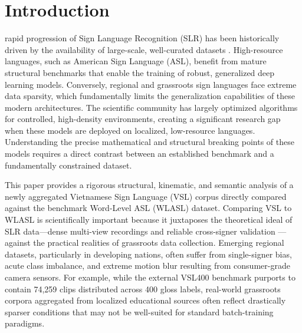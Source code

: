 \documentclass{ieeeaccess}
\begin{document}
\section{Introduction}
\label{sec:introduction}
 rapid progression of Sign Language Recognition (SLR) has been historically driven by the availability of large-scale, well-curated datasets \cite{b1}. High-resource languages, such as American Sign Language (ASL), benefit from mature structural benchmarks that enable the training of robust, generalized deep learning models. Conversely, regional and grassroots sign languages face extreme data sparsity, which fundamentally limits the generalization capabilities of these modern architectures. The scientific community has largely optimized algorithms for controlled, high-density environments, creating a significant research gap when these models are deployed on localized, low-resource languages. Understanding the precise mathematical and structural breaking points of these models requires a direct contrast between an established benchmark and a fundamentally constrained dataset.

This paper provides a rigorous structural, kinematic, and semantic analysis of a newly aggregated Vietnamese Sign Language (VSL) corpus directly compared against the benchmark Word-Level ASL (WLASL) dataset. Comparing VSL to WLASL is scientifically important because it juxtaposes the theoretical ideal of SLR data—dense multi-view recordings and reliable cross-signer validation \cite{b1}—against the practical realities of grassroots data collection. Emerging regional datasets, particularly in developing nations, often suffer from single-signer bias, acute class imbalance, and extreme motion blur resulting from consumer-grade camera sensors. For example, while the external VSL400 benchmark purports to contain 74,259 clips distributed across 400 gloss labels, real-world grassroots corpora aggregated from localized educational sources often reflect drastically sparser conditions that may not be well-suited for standard batch-training paradigms.
\end{document}
